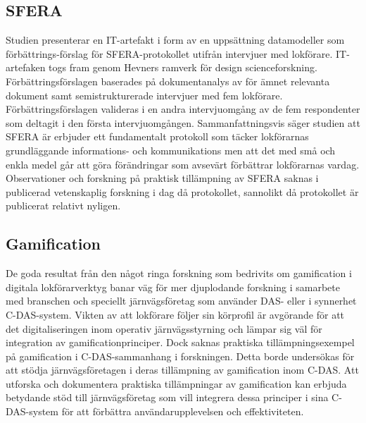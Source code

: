 \subsection{SFERA}
Studien presenterar en IT-artefakt i form av en uppsättning datamodeller som förbättrings-förslag för SFERA-protokollet utifrån intervjuer med lokförare.
IT-artefaken togs fram genom Hevners ramverk för design scienceforskning.
Förbättringsförslagen baserades på dokumentanalys av för ämnet relevanta dokument samt semistrukturerade intervjuer med fem lokförare.
Förbättringsförslagen valideras i en andra intervjuomgång av de fem respondenter som deltagit i den första intervjuomgången.
Sammanfattningsvis säger studien att SFERA är erbjuder ett fundamentalt protokoll som täcker lokförarnas grundläggande informations- och kommunikations men att det med små och enkla medel går att göra förändringar som avsevärt förbättrar lokförarnas vardag.
Observationer och forskning på praktisk tillämpning av SFERA saknas i publicerad vetenskaplig forskning i dag då protokollet, sannolikt då protokollet är publicerat relativt nyligen.
\subsection{Gamification}
De goda resultat från den något ringa forskning som bedrivits om gamification i digitala lokförarverktyg banar väg för mer djuplodande forskning i samarbete med branschen och speciellt järnvägsföretag som använder DAS- eller i synnerhet C-DAS-system.
Vikten av att lokförare följer sin körprofil är avgörande för att det digitaliseringen inom operativ järnvägsstyrning och lämpar sig väl för integration av gamificationprinciper.
Dock saknas praktiska tillämpningsexempel på gamification i C-DAS-sammanhang i forskningen.
Detta borde undersökas för att stödja järnvägsföretagen i deras tillämpning av gamification inom C-DAS.
Att utforska och dokumentera praktiska tillämpningar av gamification kan erbjuda betydande stöd till järnvägsföretag som vill integrera dessa principer i sina C-DAS-system för att förbättra användarupplevelsen och effektiviteten.